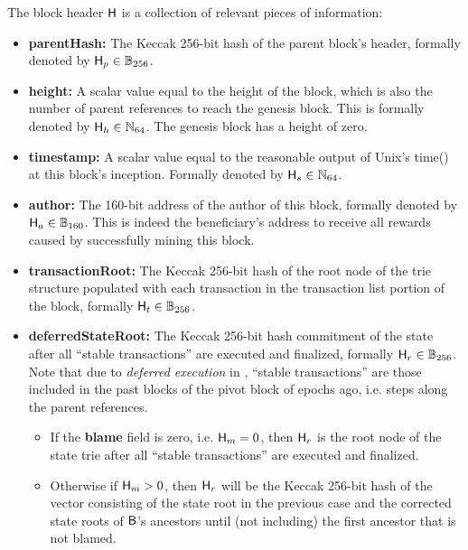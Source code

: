The block header $\textsf{H}$ is a collection of relevant pieces of information:
\begin{itemize}[nosep]
	\item {\bf parentHash:} The Keccak 256-bit hash of the parent block's header, formally denoted by $\textsf{H}_p\in\mathbb{B}_{256}$.
	
	\item {\bf height:} A scalar value equal to the height of the block, which is also the number of parent references to reach the genesis block. 
	This is formally denoted by $\textsf{H}_h\in \mathbb{N}_{64}$.
	The genesis block has a height of zero. 
	
	\item {\bf timestamp:} A scalar value equal to the reasonable output of Unix's time() at this block's inception. Formally denoted by $\textsf{H}_s \in \mathbb{N}_{64}$. 

	\item {\bf author:} The 160-bit address of the author of this block, formally denoted by $\textsf{H}_a \in \mathbb{B}_{160}$. 
	This is indeed the beneficiary's address to receive all rewards caused by successfully mining this block.

	\item {\bf transactionRoot:} The Keccak 256-bit hash of the root node of the trie structure populated with each transaction in the transaction list portion of the block, formally $\textsf{H}_t\in\mathbb{B}_{256}$.



	\item {\bf deferredStateRoot:} The Keccak 256-bit hash commitment of the state after all ``stable transactions''  are executed and finalized, formally $\textsf{H}_r\in\mathbb{B}_{256}$.
	Note that due to \emph{deferred execution} in {\name},  ``stable transactions'' are those included in the past blocks of the pivot block of  epochs ago, i.e.  steps along the parent references.
	\begin{itemize}
		\item If the {\bf blame} field is zero, i.e. $\textsf{H}_m=0$, then $\textsf{H}_r$ is the root node of the state trie after all ``stable transactions''  are executed and finalized.
	
		\item Otherwise if $\textsf{H}_m>0$, then $\textsf{H}_r$ will be the Keccak 256-bit hash of the vector consisting of the state root in the previous case and the corrected state roots of $\textsf{B}$'s ancestors until (not including) the first ancestor that is not blamed.
	\end{itemize}
	

\end{itemize}
